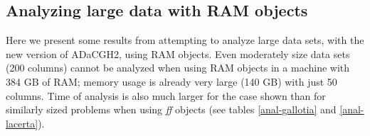 \documentclass[a4paper,11pt]{article}
\begin{document}







\clearpage
\subsection{Analyzing large data with RAM objects}
\label{ramobj}
Here we present some results from attempting to analyze large data sets,
with the new version of ADaCGH2, using RAM objects. Even moderately size
data sets (200 columns) cannot be analyzed when using RAM objects in a
machine with 384 GB of RAM; memory usage is already very large (140 GB)
with just 50 columns. Time of analysis is also much larger for the case
shown than for similarly sized problems when using \textit{ff} objects
(see tables \ref{anal-gallotia} and \ref{anal-lacerta}).


\renewcommand{\arraystretch}{1.4}
\end{document}
